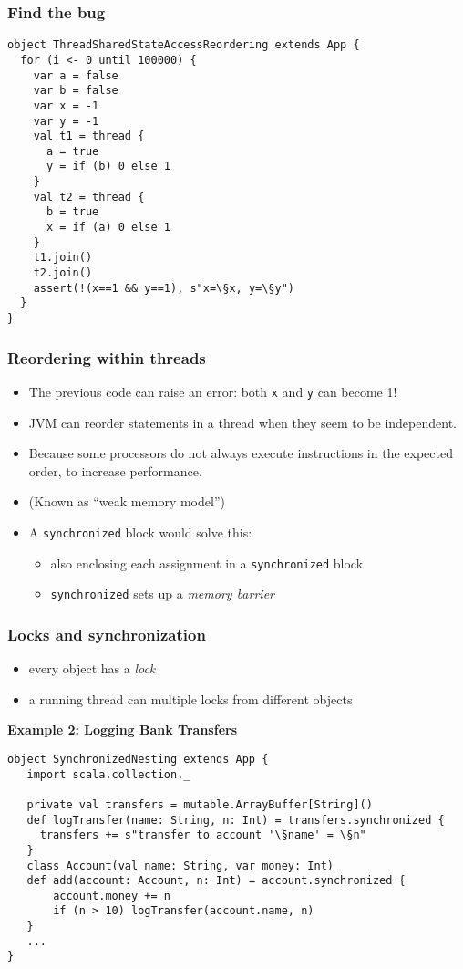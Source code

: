 \documentclass[aspectratio=169]{beamer}
\begin{document}
\begin{frame}[fragile]\frametitle{Find the bug}\label{slide:ThreadSharedStateAccessReordering}
\begin{lstlisting}[emph={assert,sleep,log,thread,join}]
object ThreadSharedStateAccessReordering extends App {
  for (i <- 0 until 100000) {
    var a = false
    var b = false
    var x = -1
    var y = -1
    val t1 = thread {
      a = true
      y = if (b) 0 else 1
    }
    val t2 = thread {
      b = true
      x = if (a) 0 else 1
    }
    t1.join()
    t2.join()
    assert(!(x==1 && y==1), s"x=\§x, y=\§y")
  }
}
\end{lstlisting}
\end{frame}


\begin{frame}\frametitle{Reordering within threads}
\begin{itemize}
  \item The previous code can raise an error: both \texttt{x} and \texttt{y} can become 1!

  \item JVM can reorder statements in a thread when they seem to be independent.

  \item Because some processors do not always execute instructions in the expected order, to increase performance.
  \item (Known as ``weak memory model'')
  \item A \texttt{synchronized} block would solve this:
    \begin{itemize}
      \item also enclosing each assignment in a \texttt{synchronized} block
      \item \texttt{synchronized} sets up a \emph{memory barrier} 
    \end{itemize}
\end{itemize}
\end{frame}




\begin{frame}[fragile]\frametitle{Locks and synchronization}
\begin{itemize}
  \item every object has a \emph{lock}
  \item a running \alert{thread} can  multiple locks from different objects
\end{itemize}

\textbf{Example 2: Logging Bank Transfers}
\begin{lstlisting}[emph={assert,sleep,log,thread,join,synchronized}]
object SynchronizedNesting extends App {
   import scala.collection._
   
   private val transfers = mutable.ArrayBuffer[String]()
   def logTransfer(name: String, n: Int) = transfers.synchronized {
     transfers += s"transfer to account '\§name' = \§n"
   }
   class Account(val name: String, var money: Int)
   def add(account: Account, n: Int) = account.synchronized {
       account.money += n
       if (n > 10) logTransfer(account.name, n)
   }
   ...
}
\end{lstlisting}
\end{frame}
\end{document}
